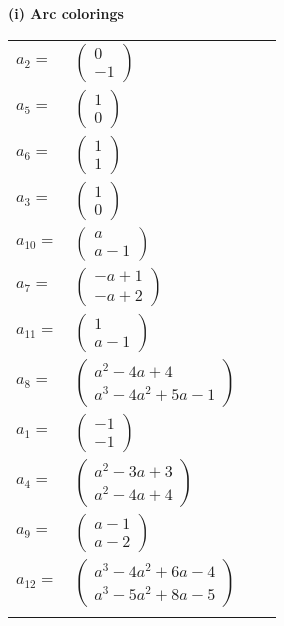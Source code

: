 \documentclass[1p]{elsarticle_modified}
\theoremstyle{definition}
\begin{document}
\flushleft \textbf{(i) Arc colorings}\\
\begin{tabular}{m{7pt} m{180pt} m{7pt} m{180pt} }
\flushright $a_{2}=$&$\begin{pmatrix}0\\-1\end{pmatrix}$ \\
\flushright $a_{5}=$&$\begin{pmatrix}1\\0\end{pmatrix}$ \\
\flushright $a_{6}=$&$\begin{pmatrix}1\\1\end{pmatrix}$ \\
\flushright $a_{3}=$&$\begin{pmatrix}1\\0\end{pmatrix}$ \\
\flushright $a_{10}=$&$\begin{pmatrix}a\\a-1\end{pmatrix}$ \\
\flushright $a_{7}=$&$\begin{pmatrix}- a+1\\- a+2\end{pmatrix}$ \\
\flushright $a_{11}=$&$\begin{pmatrix}1\\a-1\end{pmatrix}$ \\
\flushright $a_{8}=$&$\begin{pmatrix}a^2-4 a+4\\a^3-4 a^2+5 a-1\end{pmatrix}$ \\
\flushright $a_{1}=$&$\begin{pmatrix}-1\\-1\end{pmatrix}$ \\
\flushright $a_{4}=$&$\begin{pmatrix}a^2-3 a+3\\a^2-4 a+4\end{pmatrix}$ \\
\flushright $a_{9}=$&$\begin{pmatrix}a-1\\a-2\end{pmatrix}$ \\
\flushright $a_{12}=$&$\begin{pmatrix}a^3-4 a^2+6 a-4\\a^3-5 a^2+8 a-5\end{pmatrix}$\\&\end{tabular}
\end{document}

